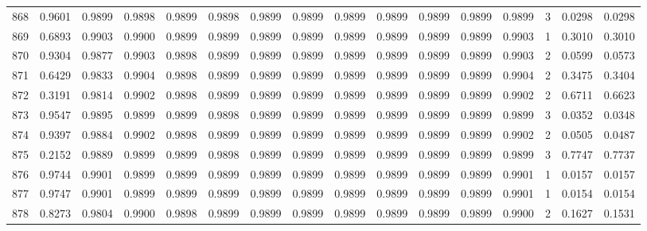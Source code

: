\begin{tabular}{lrrrrrrrrrrrrrrr}
868 &      0.9601 &  0.9899 &  0.9898 &  0.9899 &  0.9898 &  0.9899 &  0.9899 &  0.9899 &  0.9899 &  0.9899 &   0.9899 &     0.9899 &      3 &                    0.0298 &                     0.0298 \\
869 &      0.6893 &  0.9903 &  0.9900 &  0.9899 &  0.9899 &  0.9899 &  0.9899 &  0.9899 &  0.9899 &  0.9899 &   0.9899 &     0.9903 &      1 &                    0.3010 &                     0.3010 \\
870 &      0.9304 &  0.9877 &  0.9903 &  0.9898 &  0.9899 &  0.9899 &  0.9899 &  0.9899 &  0.9899 &  0.9899 &   0.9899 &     0.9903 &      2 &                    0.0599 &                     0.0573 \\
871 &      0.6429 &  0.9833 &  0.9904 &  0.9898 &  0.9899 &  0.9899 &  0.9899 &  0.9899 &  0.9899 &  0.9899 &   0.9899 &     0.9904 &      2 &                    0.3475 &                     0.3404 \\
872 &      0.3191 &  0.9814 &  0.9902 &  0.9898 &  0.9899 &  0.9899 &  0.9899 &  0.9899 &  0.9899 &  0.9899 &   0.9899 &     0.9902 &      2 &                    0.6711 &                     0.6623 \\
873 &      0.9547 &  0.9895 &  0.9899 &  0.9899 &  0.9898 &  0.9899 &  0.9899 &  0.9899 &  0.9899 &  0.9899 &   0.9899 &     0.9899 &      3 &                    0.0352 &                     0.0348 \\
874 &      0.9397 &  0.9884 &  0.9902 &  0.9898 &  0.9899 &  0.9899 &  0.9899 &  0.9899 &  0.9899 &  0.9899 &   0.9899 &     0.9902 &      2 &                    0.0505 &                     0.0487 \\
875 &      0.2152 &  0.9889 &  0.9899 &  0.9899 &  0.9898 &  0.9899 &  0.9899 &  0.9899 &  0.9899 &  0.9899 &   0.9899 &     0.9899 &      3 &                    0.7747 &                     0.7737 \\
876 &      0.9744 &  0.9901 &  0.9899 &  0.9899 &  0.9899 &  0.9899 &  0.9899 &  0.9899 &  0.9899 &  0.9899 &   0.9899 &     0.9901 &      1 &                    0.0157 &                     0.0157 \\
877 &      0.9747 &  0.9901 &  0.9899 &  0.9899 &  0.9899 &  0.9899 &  0.9899 &  0.9899 &  0.9899 &  0.9899 &   0.9899 &     0.9901 &      1 &                    0.0154 &                     0.0154 \\
878 &      0.8273 &  0.9804 &  0.9900 &  0.9898 &  0.9899 &  0.9899 &  0.9899 &  0.9899 &  0.9899 &  0.9899 &   0.9899 &     0.9900 &      2 &                    0.1627 &                     0.1531 \\

\end{tabular}
